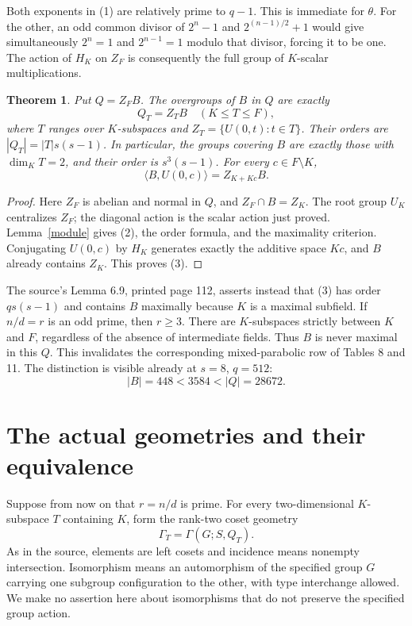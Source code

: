 \documentclass[11pt,a4paper]{article}
\newtheorem{theorem}{Theorem}
\newcommand{\gen}[1]{\langle #1\rangle}
\begin{document}
Both exponents in (1) are relatively prime to $q-1$. This is immediate
for $\theta$. For the other, an odd common divisor of
$2^n-1$ and $2^{(n-1)/2}+1$ would give simultaneously
$2^n=1$ and $2^{n-1}=1$ modulo that divisor, forcing it to be one.
The action of $H_K$ on $Z_F$ is consequently the full group of
$K$-scalar multiplications.

\begin{theorem}\label{covers}
Put $Q=Z_FB$. The overgroups of $B$ in $Q$ are exactly
\[
                   Q_T=Z_TB\quad (K\le T\le F),           \tag{2}
\]
where $T$ ranges over $K$-subspaces and $Z_T=\{U(0,t):t\in T\}$.
Their orders are $|Q_T|=|T|s(s-1)$. In particular, the groups covering
$B$ are exactly those with $\dim_K T=2$, and their order is
$s^3(s-1)$.
For every $c\in F\setminus K$,
\[
                   \gen{B,U(0,c)}=Z_{K+Kc}B.              \tag{3}
\]
\end{theorem}
\begin{proof}
Here $Z_F$ is abelian and normal in $Q$, and $Z_F\cap B=Z_K$.
The root group $U_K$ centralizes $Z_F$; the diagonal action is the
scalar action just proved. Lemma~\ref{module} gives (2), the order
formula, and the maximality criterion. Conjugating $U(0,c)$ by $H_K$
generates exactly the additive space $Kc$, and $B$ already contains
$Z_K$. This proves (3).
\end{proof}

The source's Lemma 6.9, printed page 112, asserts instead that (3) has
order $qs(s-1)$ and contains $B$ maximally because $K$ is a maximal
subfield. If $n/d=r$ is an odd prime, then $r\ge3$. There are
$K$-subspaces strictly between $K$ and $F$, regardless of the absence
of intermediate fields. Thus $B$ is never maximal in this $Q$.
This invalidates the corresponding mixed-parabolic row of Tables 8
and 11. The distinction is visible already at $s=8$, $q=512$:
\[
                   |B|=448<3584<|Q|=28672.                \tag{4}
\]

\section{The actual geometries and their equivalence}
Suppose from now on that $r=n/d$ is prime. For every two-dimensional
$K$-subspace $T$ containing $K$, form the rank-two coset geometry
\[
                     \Gamma_T=\Gamma(G;S,Q_T).            \tag{5}
\]
As in the source, elements are left cosets and incidence means
nonempty intersection. Isomorphism means an automorphism of the
specified group $G$ carrying one subgroup configuration to the other,
with type interchange allowed. We make no assertion here about
isomorphisms that do not preserve the specified group action.
\end{document}
